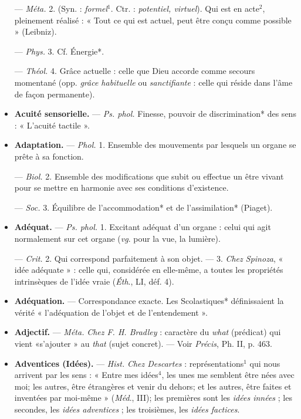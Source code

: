 \begin{itemize}[leftmargin=1cm, label=, itemsep=1pt]
— \textsf{\textit {Méta.}} 2. (Syn. : {\it formel}$^1$. Ctr. :
{\it potentiel, virtuel}). Qui est en acte$^2$,
pleinement réalisé : « Tout ce qui est
actuel, peut être conçu comme possible » (Leibniz).

— \textsf{\textit {Phys.}} 3. Cf. Énergie*.

— \textsf{\textit {Théol.}} 4. Grâce actuelle : celle
que Dieu accorde comme secours
momentané (opp. {\it grâce habituelle} ou
{\it sanctifiante} : celle qui réside dans
l’âme de façon permanente).

\item {\bf Acuité sensorielle.} — \textsf{\textit {Ps. phol.}} Finesse,
pouvoir de discrimination* des sens :
« L'acuité tactile ».

\item {\bf Adaptation.} — \textsf{\textit {Phol.}} 1. Ensemble des
mouvements par lesquels un organe
se prête à sa fonction.

— \textsf{\textit {Biol.}} 2. Ensemble des modifications que subit ou effectue un être
vivant pour se mettre en harmonie
avec ses conditions d'existence.

— \textsf{\textit {Soc.}} 3. Équilibre de l’accommodation* et de l’assimilation* (Piaget).

\item {\bf Adéquat.} — \textsf{\textit {Ps. phol.}} 1. Excitant adéquat d'un organe : celui qui agit
normalement sur cet organe ({\it vg}.
pour la vue, la lumière).

— \textsf{\textit {Crit.}} 2. Qui correspond parfaitement à son objet. — 3. {\it Chez
Spinoza}, « idée adéquate » : celle qui,
considérée en elle-même, a toutes
les propriétés intrinsèques de l’idée
vraie ({\it Éth}., LI, déf. 4).

\item {\bf Adéquation.} — Correspondance exacte.
Les Scolastiques* définissaient la
vérité « l'adéquation de l’objet et de
l'entendement ».

\item {\bf Adjectif.} — \textsf{\textit {Méta.}} {\it Chez F. H. Bradley} :
caractère du {\it what} (prédicat) qui
vient «s'ajouter » au {\it that} (sujet concret). — Voir {\it Précis}, Ph. II, p. 463.

\item {\bf Adventices (Idées).} — \textsf{\textit {Hist.}} {\it Chez Descartes} : représentations$^1$ qui nous
arrivent par les sens : « Entre mes
idées$^4$, les unes me semblent être
nées avec moi; les autres, être étrangères et venir du dehors; et les
autres, être faites et inventées par
moi-même » ({\it Méd}., III); les premières sont les {\it idées innées} ; les
secondes, les {\it idées adventices} ; les
troisièmes, les {\it idées factices}.


\end{itemize}
